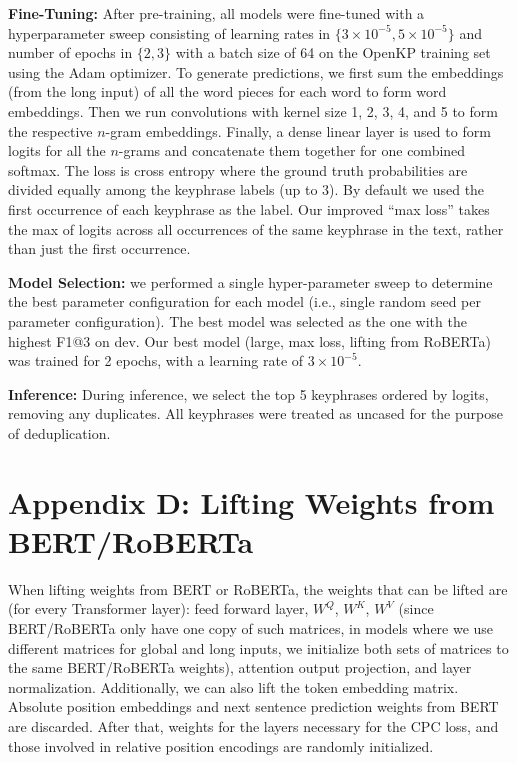 \documentclass[11pt,a4paper]{article}
\begin{document}
{\bf Fine-Tuning:} After pre-training, all models were fine-tuned with a hyperparameter sweep consisting of learning rates in $\{3\times10^{-5}, 5\times10^{-5}\}$ and number of epochs in $\{2, 3\}$ with a batch size of 64 on the OpenKP training set using the Adam optimizer. To generate predictions,  we first sum the embeddings (from the long input) of all the word pieces for each word to form word embeddings. Then we run convolutions with kernel size 1, 2, 3, 4, and 5 to form the respective $n$-gram embeddings. Finally, a dense linear layer is used to form logits for all the $n$-grams and concatenate them together for one combined softmax. The loss is cross entropy where the ground truth probabilities are divided equally among the keyphrase labels (up to 3). By default we used the first occurrence of each keyphrase as the label. Our improved ``max loss'' takes the max of logits across all occurrences of the same keyphrase in the text, rather than just the first occurrence. 

{\bf Model Selection:} we performed a single hyper-parameter sweep to determine the best parameter configuration for each model (i.e., single random seed per parameter configuration). The best model was selected as the one with the highest F1@3 on dev. Our best model (large, max loss, lifting from RoBERTa) was trained for 2 epochs, with a learning rate of $3\times10^{-5}$.

{\bf Inference:} During inference, we select the top 5 keyphrases ordered by logits, removing any duplicates. All keyphrases were treated as uncased for the purpose of deduplication.

\section*{Appendix D: Lifting Weights from BERT/RoBERTa} 



When lifting weights from BERT or RoBERTa, the weights that can be lifted are (for every Transformer layer): feed forward layer, $W^Q$, $W^K$, $W^V$ (since BERT/RoBERTa only have one copy of such matrices, in models where we use different matrices for global and long inputs, we initialize both sets of matrices to the same BERT/RoBERTa weights), attention output projection, and layer normalization. Additionally, we can also lift the token embedding matrix. Absolute position embeddings and next sentence prediction weights from BERT are discarded. After that, weights for the layers necessary for the CPC loss, and those involved in relative position encodings are randomly initialized.
\end{document}
